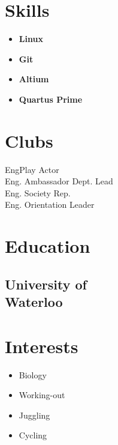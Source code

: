 \documentclass[]{chandan-cv}
\begin{document}
\begin{minipage}[t]{0.23\textwidth}

\section{Skills}
	\begin{itemize}
		\setlength\itemsep{-0.17em}
		\item \textbf{Linux}
		\item \textbf{Git}
		\item \textbf{Altium}
		\item \textbf{Quartus Prime}
	\end{itemize}

\section{Clubs}
EngPlay Actor \\
Eng. Ambassador Dept. Lead \\
Eng. Society Rep.\\
Eng. Orientation Leader

\section{Education}

\subsection{University of \\
Waterloo}

\section{Interests}
\begin{itemize}
	\setlength\itemsep{-0.3em}
	\item Biology
	\item Working-out
	\item Juggling
        \item Cycling
\end{itemize}
\sectionsep


%
%

\end{minipage}
\end{document}
